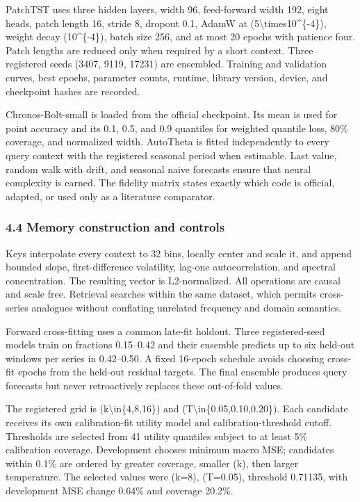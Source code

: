 \documentclass[
]{article}
\begin{document}
PatchTST uses three hidden layers, width 96, feed-forward width 192,
eight heads, patch length 16, stride 8, dropout 0.1, AdamW at
(5\textbackslash times10\^{}\{-4\}), weight decay (10\^{}\{-4\}), batch
size 256, and at most 20 epochs with patience four. Patch lengths are
reduced only when required by a short context. Three registered seeds
(3407, 9119, 17231) are ensembled. Training and validation curves, best
epochs, parameter counts, runtime, library version, device, and
checkpoint hashes are recorded.

Chronos-Bolt-small is loaded from the official checkpoint. Its mean is
used for point accuracy and its 0.1, 0.5, and 0.9 quantiles for weighted
quantile loss, 80\% coverage, and normalized width. AutoTheta is fitted
independently to every query context with the registered seasonal period
when estimable. Last value, random walk with drift, and seasonal naive
forecasts ensure that neural complexity is earned. The fidelity matrix
states exactly which code is official, adapted, or used only as a
literature comparator.

\subsubsection{4.4 Memory construction and
controls}\label{44-memory-construction-and-controls}

Keys interpolate every context to 32 bins, locally center and scale it,
and append bounded slope, first-difference volatility, lag-one
autocorrelation, and spectral concentration. The resulting vector is
L2-normalized. All operations are causal and scale free. Retrieval
searches within the same dataset, which permits cross-series analogues
without conflating unrelated frequency and domain semantics.

Forward cross-fitting uses a common late-fit holdout. Three
registered-seed models train on fractions 0.15--0.42 and their ensemble
predicts up to six held-out windows per series in 0.42--0.50. A fixed
16-epoch schedule avoids choosing cross-fit epochs from the held-out
residual targets. The final ensemble produces query forecasts but never
retroactively replaces these out-of-fold values.

The registered grid is (k\textbackslash in\{4,8,16\}) and
(T\textbackslash in\{0.05,0.10,0.20\}). Each candidate receives its own
calibration-fit utility model and calibration-threshold cutoff.
Thresholds are selected from 41 utility quantiles subject to at least
5\% calibration coverage. Development chooses minimum macro MSE;
candidates within 0.1\% are ordered by greater coverage, smaller (k),
then larger temperature. The selected values were (k=8), (T=0.05),
threshold 0.71135, with development MSE change 0.64\% and coverage
20.2\%.
\end{document}
